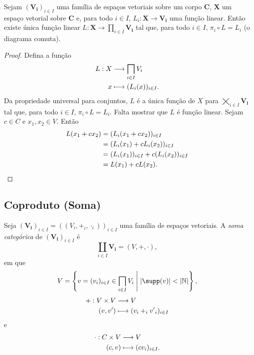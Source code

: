 \begin{prop}
Sejam $(\bm{V_i})_{i \in I}$ uma família de espaços vetoriais sobre um corpo $\bm C$, $\bm X$ um espaço vetorial sobre $\bm C$ e, para todo $i \in I$, $L_i: \bm X \to \bm{V_i}$ uma função linear. Então existe única função linear $L: \bm X \to \prod_{i \in I} \bm{V_i}$ tal que, para todo $i \in I$, $\pi_i \circ L = L_i$ (o diagrama comuta).
\begin{figure}
\centering
{}
\end{figure}
\end{prop}
\begin{proof}
Defina a função
	\begin{align*}
	\func{L}{X}{\prod_{i \in I} V_i}{x}{(L_i(x))_{i \in I}}.
	\end{align*}
Da propriedade universal para conjuntos, $L$ é a única função de $X$ para $\bigtimes_{i \in I} \bm{V_i}$ tal que, para todo $i \in I$, $\pi_i \circ L = L_i$. Falta mostrar que $L$ é função linear. Sejam $c \in C$ e $x_1,x_2 \in V$. Então
	\begin{align*}
	L(x_1+cx_2) &= (L_i(x_1+cx_2))_{i \in I} \\
		&= (L_i(x_1)+cL_i(x_2))_{i \in I} \\
		&= (L_i(x_1))_{i \in I}+c(L_i(x_2))_{i \in I} \\
		&= L(x_1)+cL(x_2). \qedhere
	\end{align*}
\end{proof}

\subsection{Coproduto (Soma)}

\begin{defi}
Seja $(\bm{V_i})_{i \in I} = ((V_i,+_i,\cdot_i))_{i \in I}$ uma família de espaços vetoriais. A \emph{soma categórica} de $(\bm{V_i})_{i \in I}$ é
	\begin{equation*}
	\coprod_{i \in I} \bm{V_i} = (V,+,\cdot),
	\end{equation*}
em que
	\begin{equation*}
	V = \set{v=(v_i)_{i \in I} \in \prod_{i \in I} V_i}{\card{\supp(v)} < \card{\N}},
	\end{equation*}
	\begin{align*}
	{+}: {V \times V} &\longrightarrow {V} \\{(v,v')} &\longmapsto {(v_i +_i {v'}_i)_{i \in I}}
	\end{align*}
e
	\begin{align*}
	{\cdot}: {C \times V} &\longrightarrow {V} \\{(c,v)} &\longmapsto {(cv_i)_{i \in I}.}
	\end{align*}
\end{defi}

